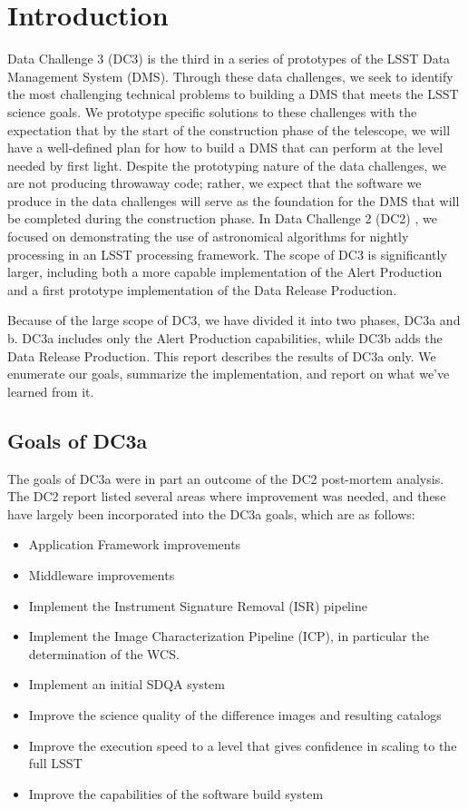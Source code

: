 
\section{Introduction}

Data Challenge 3 (DC3) is the third in a series of prototypes of the
LSST Data Management System (DMS). Through these data challenges, we
seek to identify the most challenging technical problems to building a
DMS that meets the LSST science goals. We prototype specific solutions
to these challenges with the expectation that by the start of the
construction phase of the telescope, we will have a well-defined plan
for how to build a DMS that can perform at the level needed by first
light. Despite the prototyping nature of the data challenges, we are
not producing throwaway code; rather, we expect that the software we
produce in the data challenges will serve as the foundation for the
DMS that will be completed during the construction phase.  In Data
Challenge 2 (DC2) \iffalse \ref{DC2report}\fi, we focused on
demonstrating the use of astronomical algorithms for nightly
processing in an LSST processing framework.  The scope of DC3 is
significantly larger, including both a more capable implementation of
the Alert Production and a first prototype implementation of the Data
Release Production.

Because of the large scope of DC3, we have divided it into two phases,
DC3a and b.  DC3a includes only the Alert Production capabilities,
while DC3b adds the Data Release Production.  This report describes
the results of DC3a only. We enumerate our goals, summarize the
implementation, and report on what we've learned from it.

\subsection{Goals of DC3a}

The goals of DC3a were in part an outcome of the DC2 post-mortem
analysis.  The DC2 report listed several areas where improvement was
needed, and these have largely been incorporated into the DC3a goals,
which are as follows:

\begin{itemize}
\item Application Framework improvements
\item Middleware improvements
\item Implement the Instrument Signature Removal (ISR) pipeline
\item Implement the Image Characterization Pipeline (ICP), in
  particular the determination of the WCS.
\item Implement an initial SDQA system
\item Improve the science quality of the difference images and
  resulting catalogs
\item Improve the execution speed to a level that gives confidence in
  scaling to the full LSST
\item Improve the capabilities of the software build system
\end{itemize}

